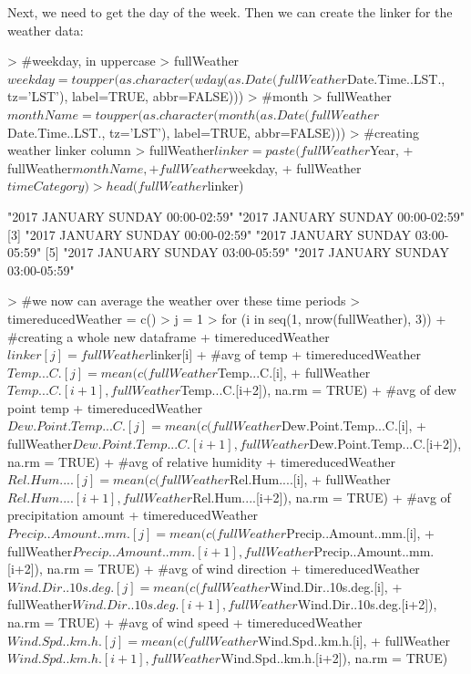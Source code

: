 \documentclass[11pt, a4paper]{article}
\begin{document}
Next, we need to get the day of the week. Then we can create the linker for the weather data:

\begin{Schunk}
\begin{Sinput}
> #weekday, in uppercase
> fullWeather$weekday = toupper(as.character(wday(as.Date(fullWeather$Date.Time..LST., tz='LST'), label=TRUE, abbr=FALSE)))
> #month
> fullWeather$monthName = toupper(as.character(month(as.Date(fullWeather$Date.Time..LST., tz='LST'), label=TRUE, abbr=FALSE)))
> #creating weather linker column
> fullWeather$linker = paste(fullWeather$Year,
+                          fullWeather$monthName,
+                          fullWeather$weekday,
+                          fullWeather$timeCategory)
> head(fullWeather$linker)
\end{Sinput}
\begin{Soutput}
[1] "2017 JANUARY SUNDAY 00:00-02:59" "2017 JANUARY SUNDAY 00:00-02:59"
[3] "2017 JANUARY SUNDAY 00:00-02:59" "2017 JANUARY SUNDAY 03:00-05:59"
[5] "2017 JANUARY SUNDAY 03:00-05:59" "2017 JANUARY SUNDAY 03:00-05:59"
\end{Soutput}
\begin{Sinput}
> #we now can average the weather over these time periods
> timereducedWeather = c()
> j = 1
> for (i in seq(1, nrow(fullWeather), 3)){
+   #creating a whole new dataframe
+   timereducedWeather$linker[j] = fullWeather$linker[i]
+   #avg of temp
+   timereducedWeather$Temp...C.[j] = mean(c(fullWeather$Temp...C.[i],
+     fullWeather$Temp...C.[i+1], fullWeather$Temp...C.[i+2]), na.rm = TRUE)
+   #avg of dew point temp
+   timereducedWeather$Dew.Point.Temp...C.[j] = mean(c(fullWeather$Dew.Point.Temp...C.[i],
+     fullWeather$Dew.Point.Temp...C.[i+1], fullWeather$Dew.Point.Temp...C.[i+2]), na.rm = TRUE)
+   #avg of relative humidity
+   timereducedWeather$Rel.Hum....[j] = mean(c(fullWeather$Rel.Hum....[i],
+     fullWeather$Rel.Hum....[i+1], fullWeather$Rel.Hum....[i+2]), na.rm = TRUE)
+   #avg of precipitation amount
+   timereducedWeather$Precip..Amount..mm.[j] = mean(c(fullWeather$Precip..Amount..mm.[i],
+     fullWeather$Precip..Amount..mm.[i+1], fullWeather$Precip..Amount..mm.[i+2]), na.rm = TRUE)
+   #avg of wind direction
+   timereducedWeather$Wind.Dir..10s.deg.[j] = mean(c(fullWeather$Wind.Dir..10s.deg.[i],
+     fullWeather$Wind.Dir..10s.deg.[i+1], fullWeather$Wind.Dir..10s.deg.[i+2]), na.rm = TRUE)
+   #avg of wind speed
+   timereducedWeather$Wind.Spd..km.h.[j] = mean(c(fullWeather$Wind.Spd..km.h.[i], 
+     fullWeather$Wind.Spd..km.h.[i+1],  fullWeather$Wind.Spd..km.h.[i+2]), na.rm = TRUE)
}
\end{Sinput}
\end{Schunk}
\end{document}
